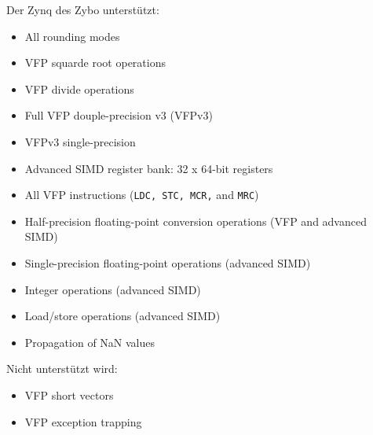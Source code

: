 Der Zynq des Zybo unterstützt:
\begin{itemize}
	\item All rounding modes
	\item VFP squarde root operations
	\item VFP divide operations
	\item Full VFP douple-precision v3 (VFPv3)
	\item VFPv3 single-precision
	\item Advanced SIMD register bank: 32 x 64-bit registers
	\item All VFP instructions (\texttt{LDC, STC, MCR,} and \texttt{MRC})
	\item Half-precision floating-point conversion operations (VFP and advanced SIMD)
	\item Single-precision floating-point operations (advanced SIMD)
	\item Integer operations (advanced SIMD)
	\item Load/store operations (advanced SIMD)
	\item Propagation of NaN values
\end{itemize}

Nicht unterstützt wird:
\begin{itemize}
	\item VFP short vectors
	\item VFP exception trapping
\end{itemize}






